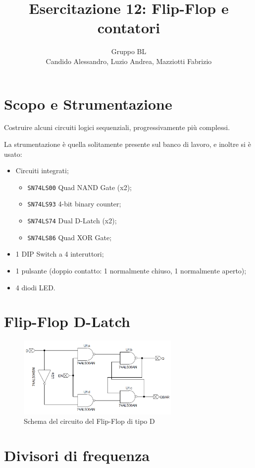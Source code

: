 \documentclass[a4paper,10pt]{article}
\title{Esercitazione 12: Flip-Flop e contatori}
\author{Gruppo BL \\ Candido Alessandro, Luzio Andrea, Mazziotti Fabrizio}
\def\code#1{\texttt{#1}}
\begin{document}
\maketitle

\section{Scopo e Strumentazione}
Costruire alcuni circuiti logici sequenziali, progressivamente
più complessi.

La strumentazione è quella solitamente presente sul banco di lavoro, e inoltre si è usato:
\begin{itemize}
	\item Circuiti integrati;
	\begin{itemize}
		\item \code{SN74LS00} Quad NAND Gate (x2);
		\item \code{SN74LS93} 4-bit binary counter;
		\item \code{SN74LS74} Dual D-Latch (x2);
		\item \code{SN74LS86} Quad XOR Gate;
	\end{itemize}
	\item 1 DIP Switch a 4 interuttori;
	\item 1 pulsante (doppio contatto: 1 normalmente chiuso, 1 normalmente aperto);
	\item 4 diodi LED.
\end{itemize}

\section{Flip-Flop D-Latch}

\begin{figure}[H]
	\centering
	\includegraphics[width=0.7\textwidth]{../grafici/FlipFlopD.png}
	\caption{Schema del circuito del Flip-Flop di tipo D}
	\label{fig:FFD}
\end{figure}

\section{Divisori di frequenza}
\end{document}

